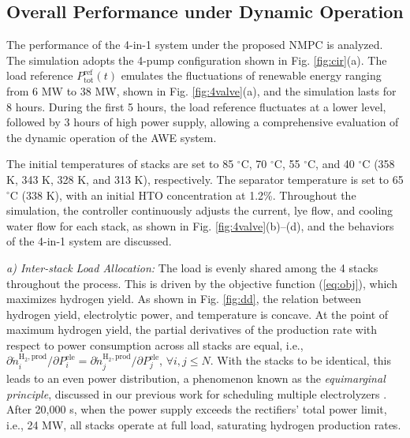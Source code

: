 \documentclass[review,3p,10pt]{elsarticle}
\begin{document}
\subsection{Overall Performance under Dynamic Operation}
\label{sec:casebase}

The performance of the 4-in-1 system under the proposed NMPC %
is analyzed. The simulation adopts the 4-pump configuration shown in Fig. \ref{fig:cir}(a).
The load reference $P_{\text{tot}}^{\text{ref}}(t)$ emulates the fluctuations of renewable energy ranging from 6 MW to 38 MW, shown in Fig. \ref{fig:4valve}(a), and the simulation lasts for 8 hours. During the first 5 hours, the load reference fluctuates at a lower level, followed by 3 hours of high power supply, allowing a comprehensive evaluation of the dynamic operation of the AWE system.

The initial temperatures of stacks are set to 85 $^\circ$C, 70 $^\circ$C, 55 $^\circ$C, and 40 $^\circ$C (358 K, 343 K, 328 K, and 313 K), respectively. The separator temperature is set to 65 $^\circ$C (338 K), with an initial HTO concentration at 1.2\%. Throughout the simulation, the controller continuously adjusts the current, lye flow, and cooling water flow for each stack, as shown in Fig. \ref{fig:4valve}(b)--(d), and the behaviors of the 4-in-1 system are discussed.

\emph{a) Inter-stack Load Allocation:} The load is evenly shared among the 4 stacks throughout the process. This is driven by the objective function (\ref{eq:obj}), which maximizes hydrogen yield. 
As shown in Fig. \ref{fig:dd}, the relation between hydrogen yield, electrolytic power, and temperature is concave. At the point of maximum hydrogen yield, the partial derivatives of the production rate with respect to power consumption across all stacks are equal, i.e., $\partial \dot{n}_{i}^{\text{H}_2,\text{prod}} / \partial P_{i}^{\text{ele}} = \partial \dot{n}_{j}^{\text{H}_2,\text{prod}} / \partial P_{j}^{\text{ele}}$, $\forall i,j\le N$. With the stacks to be identical, this leads to an even power distribution, a phenomenon known as the \emph{equimarginal principle}, discussed in our previous work for scheduling multiple electrolyzers \cite{li2024two,zeng2024scheduling}. After 20,000 s, when the power supply exceeds the rectifiers' total power limit, i.e., 24 MW, all stacks operate at full load, saturating hydrogen production rates.
\end{document}
